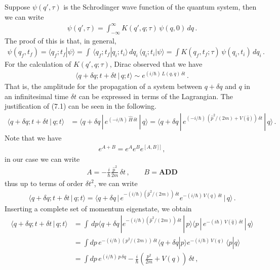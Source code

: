 \documentclass[11pt, onesided]{book}
\theoremstyle{break}
\theoremstyle{break}
\begin{document}
Suppose $\psi(q',\tau)$ is the Schrodinger wave function of the quantum system, then we can write
\begin{align*}
\psi (q',\tau) = \int_{-\infty}^\infty K(q', q;\tau) \, \psi(q,0) \, dq\,.
\end{align*} 
The proof of this is that, in general, 
\begin{align*}
\psi(q_f,t_f) = \langle q_f; t_f | \psi\rangle = \int \, \langle q_f; t_f | q_i ; t_i\rangle\, dq_i \, \langle q_i; t_i |\psi\rangle = \int K(q_f,t_f; \tau) \, \psi(q_i, t_i)\, dq_i\,.
\end{align*}
For the calculation of $K(q',q;\tau)$, Dirac observed that we have
\begin{align}
\langle q+\delta q; t+\delta t\, |\, q;t\rangle \sim e^{(i/\hbar)\, L(q,\dot{q})\, \delta t}\,.
\end{align}
That is, the amplitude for the propagation of a system between $q+\delta q$ and $q$ in an infinitesimal time $\delta t$ can be expressed in terms of the Lagrangian. The justification of (7.1) can be seen in the following. 
\begin{align*}
\langle q+\delta q; t+\delta t\, |\, q;t\rangle  
&= \langle q+\delta q \, | \, e^{(-i/\hbar)\, \hat{H}\, \delta t}\, |\, q\rangle
= \langle q + \delta q\,| \,  e^{(-i/\hbar)\, (\hat{p}^2/(2m) + V(\hat{q}) )\, \delta t}\, |\, q\rangle\,.
\end{align*}
Note that we have
\begin{align*}
e^{A+B} = e^A e^B e^{[A,B]]}\,,
\end{align*}
in our case we can write
\begin{align*}
A = -\frac{i}{\hbar}\frac{\hat{p}^2}{2m}\, \delta t\,,\qquad
B = \textbf{ADD}
\end{align*}
thus up to terms of order $\delta t^2$, we can write
\begin{align*}
\langle q + \delta q; t+\delta t\, |\, q;t\rangle = \langle q+\delta q\,
|\, e^{-(i/\hbar)(\hat{p}^2/(2m))\,\delta t}e^{-(i/\hbar)\, V(\hat{q})\, \delta t}\, |\,q\rangle\,.
\end{align*}
Inserting a complete set of momentum eigenstate, we obtain
\begin{align*}
\langle q + \delta q; t+\delta t\, |\, q;t\rangle &= 
\int \, dp \langle q+\delta q\, |
e^{-(i/\hbar)(\hat{p}^2/(2m))\, \delta t}\, | \, p\rangle \langle p \, | 
\, e^{-(i\hbar)\, V(\hat{q})\, \delta t}\, |\, q\rangle\\
&= \int dp\, e^{-(i/\hbar)(p^2/(2m))\, \delta t} \langle q+ \delta q|p\rangle e^{-(i/\hbar)\, V(q)}\, \langle p|q\rangle\\
&= \int dp\, e^{(i/\hbar)\, p\, \delta q} - \frac{i}{\hbar}\left(\frac{p^2}{2m} + V(q) \right)\, \delta t\,,
\end{align*}
\end{document}
